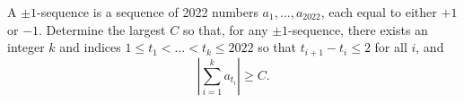A $\pm1$-sequence is a sequence of 2022 numbers $a_1, \ldots, a_{2022}$, each equal to either $+1$ or $-1$. Determine the largest $C$ so that, for any $\pm1$-sequence, there exists an integer $k$ and indices $1 \leq t_1 < \ldots < t_k \leq 2022$ so that $t_{i+1} - t_i \leq 2$ for all $i$, and
\[ \left| \sum_{i=1}^{k} a_{t_i} \right| \geq C. \]

